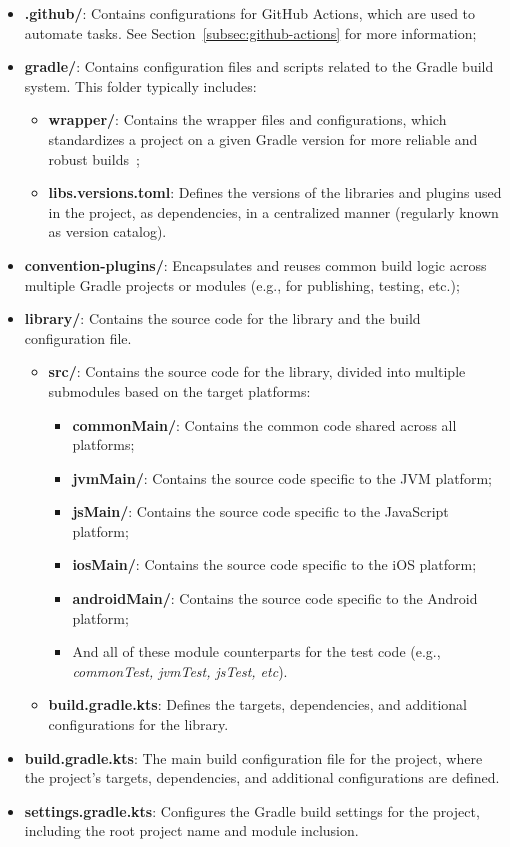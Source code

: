\begin{itemize}
    \item \textbf{.github/}: Contains configurations for GitHub Actions, which are used to automate tasks. See Section~\ref{subsec:github-actions} for more information;
    \item \textbf{gradle/}: Contains configuration files and scripts related to the Gradle build system.
    This folder typically includes:
    \begin{itemize}
        \item \textbf{wrapper/}: Contains the wrapper files and configurations, which standardizes a project on a given Gradle version for more reliable and robust builds~\cite{gradle-wrapper};
        \item \textbf{libs.versions.toml}: Defines the versions of the libraries and plugins used in the project, as dependencies, in a centralized manner (regularly known as version catalog).
    \end{itemize}
    \item \textbf{convention-plugins/}: Encapsulates and reuses common build logic across multiple Gradle projects or modules (e.g., for publishing, testing, etc.);
    \item \textbf{library/}: Contains the source code for the library and the build configuration file.
    \begin{itemize}
        \item \textbf{src/}: Contains the source code for the library, divided into multiple submodules based on the target platforms:
        \begin{itemize}
            \item \textbf{commonMain/}: Contains the common code shared across all platforms;
            \item \textbf{jvmMain/}: Contains the source code specific to the JVM platform;
            \item \textbf{jsMain/}: Contains the source code specific to the JavaScript platform;
            \item \textbf{iosMain/}: Contains the source code specific to the iOS platform;
            \item \textbf{androidMain/}: Contains the source code specific to the Android platform;
            \item And all of these module counterparts for the test code (e.g., \textit{commonTest, jvmTest, jsTest, etc}).
        \end{itemize}
        \item \textbf{build.gradle.kts}: Defines the targets, dependencies, and additional configurations for the library.
    \end{itemize}
    \item \textbf{build.gradle.kts}: The main build configuration file for the project, where the project's targets, dependencies, and additional configurations are defined.
    \item \textbf{settings.gradle.kts}: Configures the Gradle build settings for the project, including the root project name and module inclusion.
\end{itemize}

